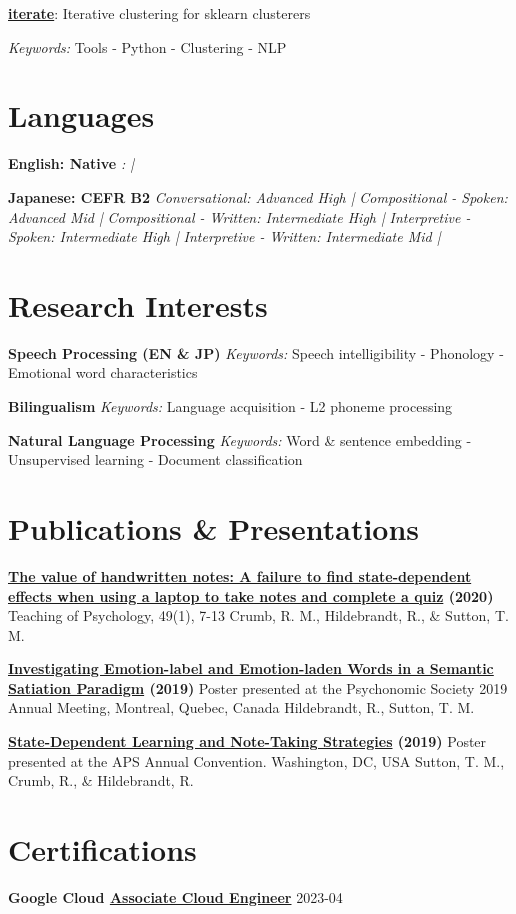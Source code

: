 \documentclass[a4paper,9pt]{extarticle}
\begin{document}
\noindent\textbf{\href{https://github.com/ryancahildebrandt/iterate}{iterate}}: Iterative clustering for sklearn clusterers

\textit{Keywords:} Tools - Python - Clustering - NLP

\section*{Languages}
\noindent\textbf{English: Native}
\textit{:  |}

\noindent\textbf{Japanese: CEFR B2}
\textit{Conversational: Advanced High |}
\textit{Compositional - Spoken: Advanced Mid |}
\textit{Compositional - Written: Intermediate High |}
\textit{Interpretive - Spoken: Intermediate High |}
\textit{Interpretive - Written: Intermediate Mid |}

\section*{Research Interests}
\noindent\textbf{Speech Processing (EN \& JP)}
\textit{Keywords:} Speech intelligibility - Phonology - Emotional word characteristics

\noindent\textbf{Bilingualism}
\textit{Keywords:} Language acquisition - L2 phoneme processing

\noindent\textbf{Natural Language Processing}
\textit{Keywords:} Word \& sentence embedding - Unsupervised learning - Document classification

\section*{Publications \& Presentations}
\noindent\textbf{\href{http://dx.doi.org/10.1177/0098628320979895}{The value of handwritten notes: A failure to find state-dependent effects when using a laptop to take notes and complete a quiz} (2020)}
Teaching of Psychology, 49(1), 7-13
Crumb, R. M., Hildebrandt, R., \& Sutton, T. M.

\noindent\textbf{\href{}{Investigating Emotion-label and Emotion-laden Words in a Semantic Satiation Paradigm} (2019)}
Poster presented at the Psychonomic Society 2019 Annual Meeting, Montreal, Quebec, Canada
Hildebrandt, R., Sutton, T. M.

\noindent\textbf{\href{}{State-Dependent Learning and Note-Taking Strategies} (2019)}
Poster presented at the APS Annual Convention. Washington, DC, USA
Sutton, T. M., Crumb, R., \& Hildebrandt, R.

\section*{Certifications}
\noindent\textbf{Google Cloud \href{https://google.accredible.com/d3ef369f-9c2c-486a-bda6-943a74f70dff}{Associate Cloud Engineer}}
\hfill2023-04
\end{document}
